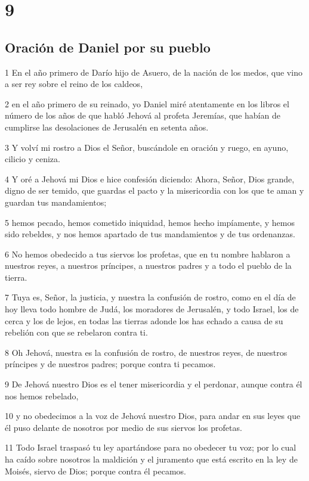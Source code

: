 \chapter{9}

\section*{Oración de Daniel por su pueblo}

\par 1 En el año primero de Darío hijo de Asuero, de la nación de los medos, que vino a ser rey sobre el reino de los caldeos,
\par 2 en el año primero de su reinado, yo Daniel miré atentamente en los libros el número de los años de que habló Jehová al profeta Jeremías, que habían de cumplirse las desolaciones de Jerusalén en setenta años. 
\par 3 Y volví mi rostro a Dios el Señor, buscándole en oración y ruego, en ayuno, cilicio y ceniza.
\par 4 Y oré a Jehová mi Dios e hice confesión diciendo: Ahora, Señor, Dios grande, digno de ser temido, que guardas el pacto y la misericordia con los que te aman y guardan tus mandamientos;
\par 5 hemos pecado, hemos cometido iniquidad, hemos hecho impíamente, y hemos sido rebeldes, y nos hemos apartado de tus mandamientos y de tus ordenanzas.
\par 6 No hemos obedecido a tus siervos los profetas, que en tu nombre hablaron a nuestros reyes, a nuestros príncipes, a nuestros padres y a todo el pueblo de la tierra.
\par 7 Tuya es, Señor, la justicia, y nuestra la confusión de rostro, como en el día de hoy lleva todo hombre de Judá, los moradores de Jerusalén, y todo Israel, los de cerca y los de lejos, en todas las tierras adonde los has echado a causa de su rebelión con que se rebelaron contra ti.
\par 8 Oh Jehová, nuestra es la confusión de rostro, de nuestros reyes, de nuestros príncipes y de nuestros padres; porque contra ti pecamos.
\par 9 De Jehová nuestro Dios es el tener misericordia y el perdonar, aunque contra él nos hemos rebelado,
\par 10 y no obedecimos a la voz de Jehová nuestro Dios, para andar en sus leyes que él puso delante de nosotros por medio de sus siervos los profetas.
\par 11 Todo Israel traspasó tu ley apartándose para no obedecer tu voz; por lo cual ha caído sobre nosotros la maldición y el juramento que está escrito en la ley de Moisés, siervo de Dios; porque contra él pecamos.
